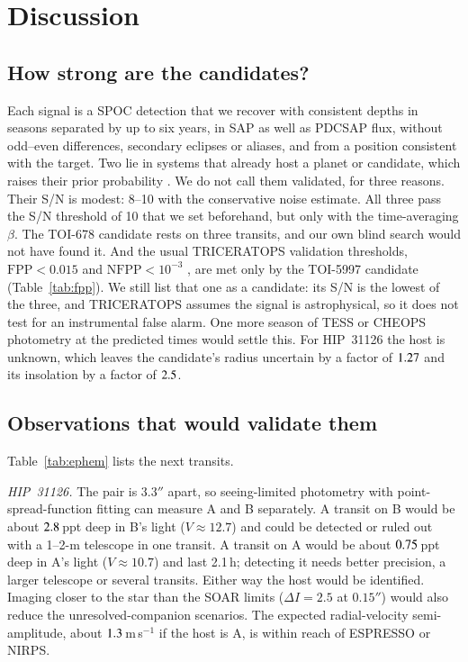 \documentclass[twocolumn,numberedappendix,appendixfloats]{openjournal}
\begin{document}
\section{Discussion}
\label{sec:disc}

\subsection{How strong are the candidates?}

Each signal is a SPOC detection that we recover with consistent depths in
seasons separated by up to six years, in SAP as well as PDCSAP flux, without
odd--even differences, secondary eclipses or aliases, and from a position
consistent with the target. Two lie in systems that already host a planet or
candidate, which raises their prior probability \citep{lissauer2012}. We do not
call them validated, for three reasons. Their S/N is modest: 8--10 with the
conservative noise estimate. All three pass the S/N threshold of 10 that we set
beforehand, but only with the time-averaging $\beta$. The TOI-678 candidate rests on three transits,
and our own blind search would not have found it. And the usual TRICERATOPS
validation thresholds, $\mathrm{FPP} < 0.015$ and $\mathrm{NFPP} < 10^{-3}$
\citep{giacalone2021}, are met only by the TOI-5997 candidate
(Table~\ref{tab:fpp}). We still list that one as a candidate: its S/N is the
lowest of the three, and TRICERATOPS assumes the signal is astrophysical, so
it does not test for an instrumental false alarm. One more season of TESS or
CHEOPS photometry at the predicted times would settle this. For HIP~31126 the host is unknown, which leaves the
candidate's radius uncertain by a factor of $1.27$ and its insolation by a
factor of $2.5$.

\subsection{Observations that would validate them}
\label{sec:followup}

Table~\ref{tab:ephem} lists the next transits.

\emph{HIP~31126.} The pair is $3.3''$ apart, so seeing-limited photometry with
point-spread-function fitting can measure A and B separately. A transit on B
would be about $2.8$\,ppt deep in B's light ($V \approx 12.7$) and could
be detected or ruled out with a 1--2-m telescope in one transit. A transit on A
would be about $0.75$\,ppt deep in A's light ($V \approx 10.7$) and last 2.1\,h;
detecting it needs better precision, a larger telescope or several transits. Either
way the host would be identified. Imaging closer to the star than the SOAR
limits ($\Delta I = 2.5$ at $0.15''$) would also reduce the unresolved-companion
scenarios. The expected radial-velocity semi-amplitude, about $1.3$\,m\,s$^{-1}$
if the host is A, is within reach of ESPRESSO or NIRPS.
\end{document}
